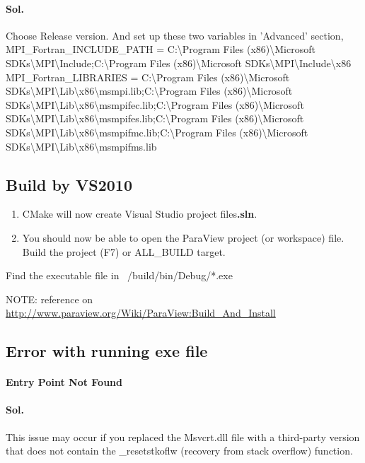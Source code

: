 \paragraph{Sol.} Choose Release version. And set up these two variables in 'Advanced' section, 
MPI\_Fortran\_INCLUDE\_PATH = C:\textbackslash Program Files (x86)\textbackslash Microsoft SDKs\textbackslash MPI\textbackslash Include;C:\textbackslash Program Files (x86)\textbackslash Microsoft SDKs\textbackslash MPI\textbackslash Include\textbackslash x86 
MPI\_Fortran\_LIBRARIES = C:\textbackslash Program Files (x86)\textbackslash Microsoft SDKs\textbackslash MPI\textbackslash Lib\textbackslash x86\textbackslash msmpi.lib;C:\textbackslash Program Files (x86)\textbackslash Microsoft SDKs\textbackslash MPI\textbackslash Lib\textbackslash x86\textbackslash msmpifec.lib;C:\textbackslash Program Files (x86)\textbackslash Microsoft SDKs\textbackslash MPI\textbackslash Lib\textbackslash x86\textbackslash msmpifes.lib;C:\textbackslash Program Files (x86)\textbackslash Microsoft SDKs\textbackslash MPI\textbackslash Lib\textbackslash x86\textbackslash msmpifmc.lib;C:\textbackslash Program Files (x86)\textbackslash Microsoft SDKs\textbackslash MPI\textbackslash Lib\textbackslash x86\textbackslash msmpifms.lib

\subsection{Build by VS2010}
\begin{enumerate}
\item CMake will now create Visual Studio project files{\bf *.sln}.
\item You should now be able to open the ParaView project (or workspace) file. Build the project (F7) or ALL\_BUILD target. \end{enumerate}
Find the executable file in ~/build/bin/Debug/*.exe


NOTE: reference on \url{http://www.paraview.org/Wiki/ParaView:Build\_And\_Install}

\subsection{Error with running exe file}
\paragraph{ Entry Point Not Found }
\paragraph{Sol.} This issue may occur if you replaced the Msvcrt.dll file with a third-party version that does not contain the \_resetstkoflw (recovery from stack overflow) function.
 

